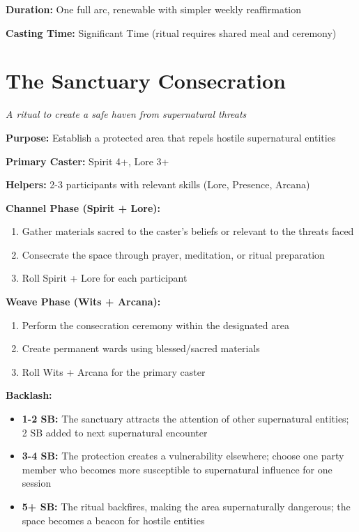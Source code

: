 \textbf{Duration:} One full arc, renewable with simpler weekly reaffirmation

\textbf{Casting Time:} Significant Time (ritual requires shared meal and ceremony)

\section*{The Sanctuary Consecration}
\textit{A ritual to create a safe haven from supernatural threats}

\textbf{Purpose:} Establish a protected area that repels hostile supernatural entities

\textbf{Primary Caster:} Spirit 4+, Lore 3+

\textbf{Helpers:} 2-3 participants with relevant skills (Lore, Presence, Arcana)

\textbf{Channel Phase (Spirit + Lore):}
\begin{enumerate}
\item Gather materials sacred to the caster's beliefs or relevant to the threats faced
\item Consecrate the space through prayer, meditation, or ritual preparation
\item Roll Spirit + Lore for each participant
\end{enumerate}

\textbf{Weave Phase (Wits + Arcana):}
\begin{enumerate}
\item Perform the consecration ceremony within the designated area
\item Create permanent wards using blessed/sacred materials
\item Roll Wits + Arcana for the primary caster
\end{enumerate}

\textbf{Backlash:}
\begin{itemize}
\item \textbf{1-2 SB:} The sanctuary attracts the attention of other supernatural entities; 2 SB added to next supernatural encounter
\item \textbf{3-4 SB:} The protection creates a vulnerability elsewhere; choose one party member who becomes more susceptible to supernatural influence for one session
\item \textbf{5+ SB:} The ritual backfires, making the area supernaturally dangerous; the space becomes a beacon for hostile entities
\end{itemize}


